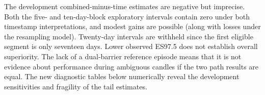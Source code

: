 \documentclass[11pt,a4paper]{article}
\begin{document}
\begin{minipage}{\linewidth}
\end{minipage}\par\addvspace{8pt}

The development combined-minus-time estimates are negative but imprecise. Both the five- and ten-day-block exploratory intervals contain zero under both timestamp interpretations, and modest gains are possible (along with losses under the resampling model). Twenty-day intervals are withheld since the first eligible segment is only seventeen days. Lower observed ES97.5 does not establish overall superiority. The lack of a dual-barrier reference episode means that it is not evidence about performance during ambiguous candles if the two path results are equal. The new diagnostic tables below numerically reveal the development sensitivities and fragility of the tail estimates.


\end{document}
